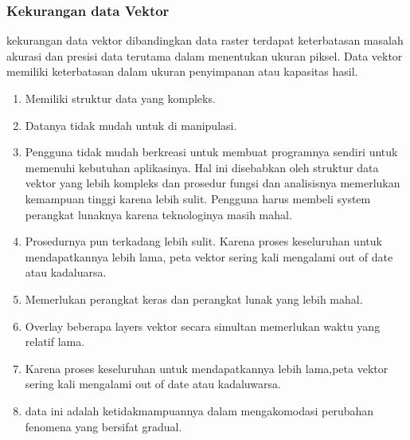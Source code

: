 \subsubsection{Kekurangan data Vektor}
kekurangan data vektor dibandingkan data raster
terdapat keterbatasan masalah akurasi dan presisi data terutama dalam menentukan ukuran piksel. Data vektor memiliki keterbatasan dalam ukuran penyimpanan atau kapasitas hasil.
\begin{enumerate}
\item Memiliki struktur data yang kompleks.
\item Datanya tidak mudah untuk di manipulasi.
\item Pengguna tidak mudah berkreasi untuk membuat programnya sendiri untuk memenuhi kebutuhan aplikasinya. Hal ini disebabkan oleh struktur data vektor yang lebih kompleks dan prosedur fungsi dan analisisnya memerlukan kemampuan tinggi karena lebih sulit. Pengguna harus membeli system perangkat lunaknya karena teknologinya masih mahal.
\item Prosedurnya pun terkadang lebih sulit. Karena proses keseluruhan untuk mendapatkannya lebih lama, peta vektor sering kali mengalami out of date atau kadaluarsa.
\item Memerlukan perangkat keras dan perangkat lunak yang lebih mahal.
\item Overlay beberapa layers vektor secara simultan memerlukan waktu yang relatif lama.
\item Karena proses keseluruhan untuk mendapatkannya lebih lama,peta vektor sering kali mengalami out of date atau kadaluwarsa.
\item data ini adalah ketidakmampuannya dalam mengakomodasi perubahan fenomena yang bersifat gradual.
\end{enumerate}

